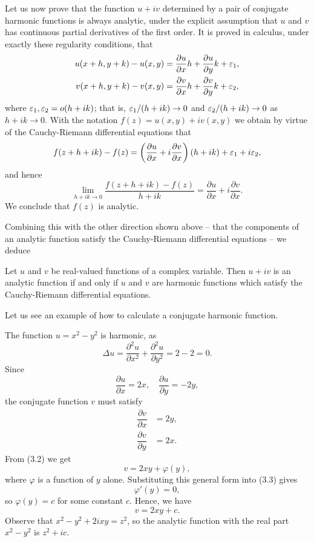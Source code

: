 Let us now prove that the function $u+iv$ determined by a pair of conjugate harmonic functions is always analytic, under the explicit assumption that $u$ and $v$ has continuous partial derivatives of the first order. It is proved in calculus, under exactly these regularity conditions, that
\begin{align*}
	u(x+h,y+k)-u(x,y) &=\dfrac{\partial u}{\partial x}h+\dfrac{\partial u}{\partial y}k+\varepsilon_1, \\
	v(x+h,y+k)-v(x,y) &=\dfrac{\partial v}{\partial x}h+\dfrac{\partial v}{\partial y}k+\varepsilon_2,
\end{align*}
where $\varepsilon_1,\varepsilon_2=o(h+ik)$; that is, $\varepsilon_1/(h+ik) \rightarrow 0$ and $\varepsilon_2/(h+ik) \rightarrow 0$ as $h+ik \rightarrow 0$. With the notation $f(z)=u(x,y)+iv(x,y)$ we obtain by virtue of the Cauchy-Riemann differential equations that $$f(z+h+ik)-f(z)=\left(\dfrac{\partial u}{\partial x}+i\dfrac{\partial v}{\partial x}\right)(h+ik)+\varepsilon_1+i\varepsilon_2,$$ and hence $$\lim_{h+ik \rightarrow 0} \dfrac{f(z+h+ik)-f(z)}{h+ik}=\dfrac{\partial u}{\partial x}+i\dfrac{\partial v}{\partial x}.$$ We conclude that $f(z)$ is analytic.

Combining this with the other direction shown above -- that the components of an analytic function satisfy the Cauchy-Riemann differential equations -- we deduce
\begin{proposition}
	\label{prop:analytic-conjugate-harmonic}
	Let $u$ and $v$ be real-valued functions of a complex variable. Then $u+iv$ is an analytic function if and only if $u$ and $v$ are harmonic functions which satisfy the Cauchy-Riemann differential equations.
\end{proposition}
Let us see an example of how to calculate a conjugate harmonic function.
\begin{example}
	The function $u=x^2-y^2$ is harmonic, as $$\Delta u=\dfrac{\partial^2 u}{\partial x^2}+\dfrac{\partial^2 u}{\partial y^2}=2-2=0.$$ Since $$\dfrac{\partial u}{\partial x}=2x, \quad \dfrac{\partial u}{\partial y}=-2y,$$ the conjugate function $v$ must satisfy
	\begin{align}
		\dfrac{\partial v}{\partial x} &=2y, \\
		\dfrac{\partial v}{\partial y} &=2x.
	\end{align}
	From (3.2) we get $$v=2xy+\varphi(y),$$ where $\varphi$ is a function of $y$ alone. Substituting this general form into (3.3) gives $$\varphi'(y)=0,$$ so $\varphi(y)=c$ for some constant $c$. Hence, we have $$v=2xy+c.$$ Observe that $x^2-y^2+2ixy=z^2$, so the analytic function with the real part $x^2-y^2$ is $z^2+ic$.
\end{example}

